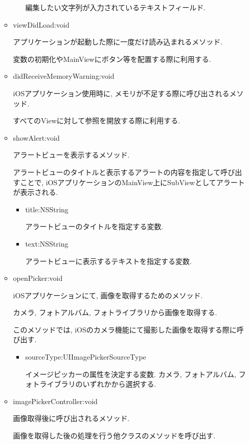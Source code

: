 \begin{itemize}
\begin{itemize}
\begin{itemize}
編集したい文字列が入力されているテキストフィールド.
\end{itemize}

\item viewDidLoad:void

アプリケーションが起動した際に一度だけ読み込まれるメソッド.

変数の初期化やMainViewにボタン等を配置する際に利用する.

\item didReceiveMemoryWarning:void

iOSアプリケーション使用時に, メモリが不足する際に呼び出されるメソッド.

すべてのViewに対して参照を開放する際に利用する.

\item showAlert:void

アラートビューを表示するメソッド.

アラートビューのタイトルと表示するアラートの内容を指定して呼び出すことで, iOSアプリケーションのMainView上にSubViewとしてアラートが表示される.

\begin{itemize}
\item title:NSString

アラートビューのタイトルを指定する変数.

\item text:NSString

アラートビューに表示するテキストを指定する変数.
\end{itemize}

\item openPicker:void

iOSアプリケーションにて, 画像を取得するためのメソッド.

カメラ, フォトアルバム, フォトライブラリから画像を取得する.

このメソッドでは, iOSのカメラ機能にて撮影した画像を取得する際に呼び出す.

\begin{itemize}
\item sourceType:UIImagePickerSourceType

イメージピッカーの属性を決定する変数.
カメラ, フォトアルバム, フォトライブラリのいずれかから選択する.
\end{itemize}

\item imagePickerController:void

画像取得後に呼び出されるメソッド.

画像を取得した後の処理を行う他クラスのメソッドを呼び出す.


\end{itemize}
\end{itemize}

